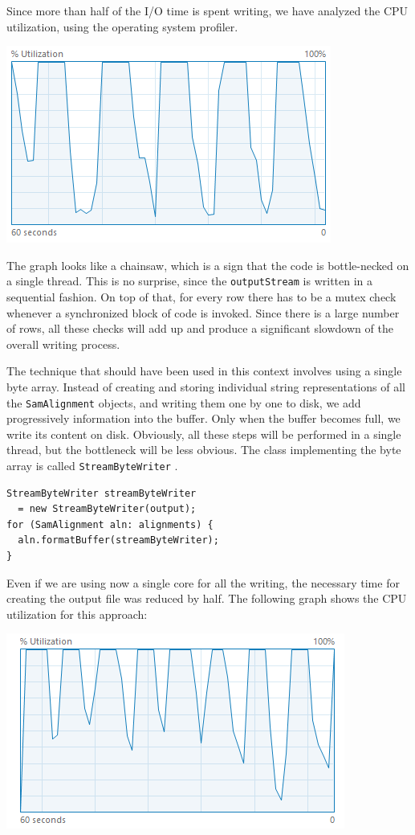 \documentclass[a4paper,twoside]{article}
\begin{document}
Since more than half of the I/O time is spent writing, we have analyzed the CPU utilization, using the operating system profiler.
\begin{center}
\includegraphics[scale=0.5]{images/cpu_original.png}
\end{center}
The graph looks like a chainsaw, which is a sign that the code is bottle-necked on a single thread.
This is no surprise, since the {\texttt{outputStream} } is written in a sequential fashion.
On top of that, for every row there has to be a mutex check whenever a synchronized block of code is invoked.
Since there is a large number of rows, all these checks will add up and produce a significant slowdown of the overall writing process.

The technique that should have been used in this context involves using a single byte array.
Instead of creating and storing individual string representations of all the {\texttt{SamAlignment} } objects, and writing them one by one to disk, we add progressively information into the buffer.
Only when the buffer becomes full, we write its content on disk.
Obviously, all these steps will be performed in a single thread, but the bottleneck will be less obvious.
The class implementing the byte array is called {\texttt{StreamByteWriter} }.
\begin{verbatim}
StreamByteWriter streamByteWriter 
  = new StreamByteWriter(output);
for (SamAlignment aln: alignments) {
  aln.formatBuffer(streamByteWriter);
}
\end{verbatim}
Even if we are using now a single core for all the writing, the necessary time for creating the output file was reduced by half.
The following graph shows the CPU utilization for this approach:
\begin{center}
\includegraphics[scale=0.5]{images/cpu_optimized.png}
\end{center}
\end{document}
